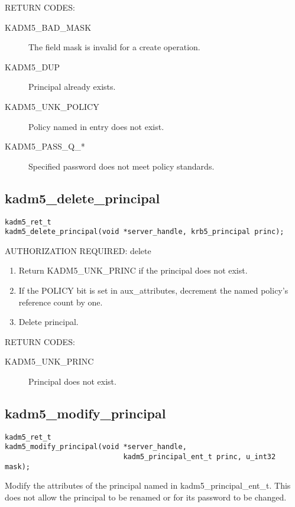 RETURN CODES:

\begin{description}
\item[KADM5_BAD_MASK] The field mask is invalid for a create
operation.
\item[KADM5_DUP] Principal already exists.
\item[KADM5_UNK_POLICY] Policy named in entry does not exist.
\item[KADM5_PASS_Q_*] Specified password does not meet policy
standards.
\end{description}

\subsection{kadm5_delete_principal}

\begin{verbatim}
kadm5_ret_t
kadm5_delete_principal(void *server_handle, krb5_principal princ);
\end{verbatim}

AUTHORIZATION REQUIRED: delete 

\begin{enumerate}
\item Return KADM5_UNK_PRINC if the principal does not exist.
\item If the POLICY bit is set in aux_attributes, decrement the named
policy's reference count by one.
\item Delete principal.
\end{enumerate}

RETURN CODES: 

\begin{description}
\item[KADM5_UNK_PRINC] Principal does not exist.
\end{description}

\subsection{kadm5_modify_principal}

\begin{verbatim}
kadm5_ret_t
kadm5_modify_principal(void *server_handle,
                            kadm5_principal_ent_t princ, u_int32 mask);
\end{verbatim}

Modify the attributes of the principal named in
kadm5_principal_ent_t. This does not allow the principal to be
renamed or for its password to be changed.

